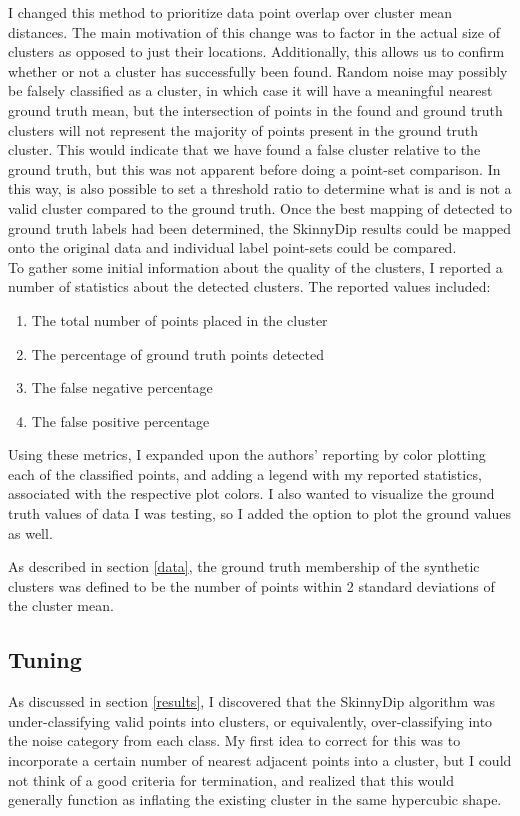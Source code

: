 \documentclass{sig-alternate-05-2015}
\begin{document}
I changed this method to prioritize data point overlap over cluster mean distances. The main motivation of this change was to factor in the actual size of clusters as opposed to just their locations. Additionally, this allows us to confirm whether or not a cluster has successfully been found. Random noise may possibly be falsely classified as a cluster, in which case it will have a meaningful nearest ground truth mean, but the intersection of points in the found and ground truth clusters will not represent the majority of points present in the ground truth cluster. This would indicate that we have found a false cluster relative to the ground truth, but this was not apparent before doing a point-set comparison. In this way, is also possible to set a threshold ratio to determine what is and is not a valid cluster compared to the ground truth. Once the best mapping of detected to ground truth labels had been determined, the SkinnyDip results could be mapped onto the original data and individual label point-sets could be compared. \\

To gather some initial information about the quality of the clusters, I reported a number of statistics about the detected clusters. The reported values included:
\begin{enumerate}
	\item The total number of points placed in the cluster
	\item The percentage of ground truth points detected
	\item The false negative percentage
	\item The false positive percentage
\end{enumerate}
Using these metrics, I expanded upon the authors' reporting by color plotting each of the classified points, and adding a legend with my reported statistics, associated with the respective plot colors. I also wanted to visualize the ground truth values of data I was testing, so I added the option to plot the ground values as well. 


As described in section \ref{data}, the ground truth membership of the synthetic clusters was defined to be the number of points within 2 standard deviations of the cluster mean.
\subsection{Tuning}
As discussed in section \ref{results}, I discovered that the SkinnyDip algorithm was under-classifying valid points into clusters, or equivalently, over-classifying into the noise category from each class. My first idea to correct for this was to incorporate a certain number of nearest adjacent points into a cluster, but I could not think of a good criteria for termination, and realized that this would generally function as inflating the existing cluster in the same hypercubic shape.
\end{document}
